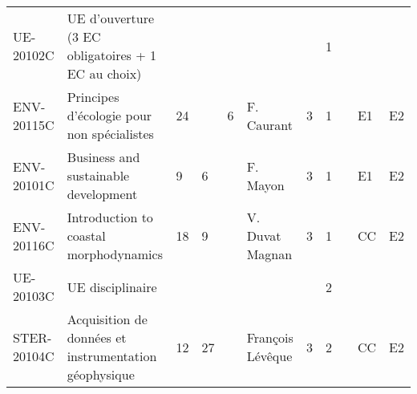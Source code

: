 \documentclass[a4paper,11pt]{article}
\begin{document}
{{\begin{tabular}{lllllllllll}
\rowcolor[HTML]{C0C0C0} 
UE-20102C                      & UE d'ouverture (3 EC obligatoires + 1 EC au choix)                                        &                           &                           &                           &                                    &                             & 1                           &                                    &                                  &                                  \\
ENV-20115C                     & Principes d'écologie pour non spécialistes                                                & 24                        &                           & 6                         & F. Caurant                         & 3                           & 1                           &                                    & E1                               & E2                               \\
ENV-20101C                     & Business and sustainable development                                                      & 9                         & 6                         &                           & F. Mayon                           & 3                           & 1                           &                                    & E1                               & E2                               \\
ENV-20116C                     & Introduction to coastal morphodynamics                                                    & 18                        & 9                         &                           & V. Duvat Magnan                    & 3                           & 1                           &                                    & CC                               & E2                               \\
\rowcolor[HTML]{C0C0C0} 
UE-20103C                      & UE disciplinaire                                                                          &                           &                           &                           &                                    &                             & 2                           &                                    &                                  &                                  \\
STER-20104C                    & Acquisition de données et instrumentation géophysique                                     & 12                        & 27                        &                           & François Lévêque                   & 3                           & 2                           &                                    & CC                               & E2                               \\

\end{tabular}}}
\end{document}
